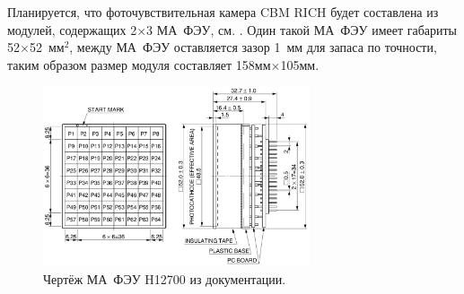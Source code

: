 Планируется, что фоточувствительная камера CBM RICH будет составлена из модулей, содержащих 2$\times$3 МА~ФЭУ, см. . Один такой МА~ФЭУ имеет габариты 52$\times$52~мм$^2$, между МА~ФЭУ оставляется зазор 1~мм для запаса по точности, таким образом размер модуля составляет 158мм$\times$105мм.

\begin{figure}[H]
\centering
\includegraphics[width=0.7\textwidth]{pictures/H12700_drawing.png}
\caption{Чертёж МА~ФЭУ H12700 из документации.}
\label{fig:H12700drawing}
\end{figure}

